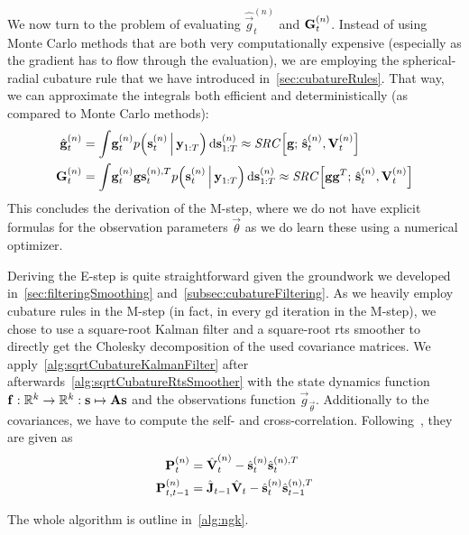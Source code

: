 	We now turn to the problem of evaluating \( \hat{\vec{g}}_t^{(n)} \) and \( \boldsymbol{\mathrm{G}}_t^{(n)} \). Instead of using Monte Carlo methods that are both very computationally expensive (especially as the gradient has to flow through the evaluation), we are employing the spherical-radial cubature rule that we have introduced in~\autoref{sec:cubatureRules}. That way, we can approximate the integrals both efficient and deterministically (as compared to Monte Carlo methods):
	\begin{align}
		\hat{\boldsymbol{\mathrm{g}}}_t^{(n)} &= \int\! \boldsymbol{\mathrm{g}}_t^{(n)} p\Big(\boldsymbol{\mathrm{s}}_t^{(n)} \,\Big\vert\, \boldsymbol{\mathrm{y}}_{1:T}\Big) \dd{\boldsymbol{\mathrm{s}}_{1:T}^{(n)}} \approx \mathit{SRC}\Big[\boldsymbol{\mathrm{g}};\, \hat{\boldsymbol{\mathrm{s}}}_t^{(n)}, \boldsymbol{\mathrm{V}}_t^{(n)}\Big]  \label{eq:ngkgeval} \\
		\boldsymbol{\mathrm{G}}_t^{(n)}       &= \int\! \boldsymbol{\mathrm{g}}_t^{(n)} \boldsymbol{\mathrm{g}}\boldsymbol{\mathrm{s}}_t^{(n), T} p\Big(\boldsymbol{\mathrm{s}}_t^{(n)} \,\Big\vert\, \boldsymbol{\mathrm{y}}_{1:T} \Big) \dd{\boldsymbol{\mathrm{s}}_{1:T}^{(n)}} \approx \mathit{SRC}\Big[\boldsymbol{\mathrm{g}} \boldsymbol{\mathrm{g}}^T;\, \hat{\boldsymbol{\mathrm{s}}}_t^{(n)}, \boldsymbol{\mathrm{V}}_t^{(n)}\Big]  \label{eq:ngkGeval}
	\end{align}
	This concludes the derivation of the M-step, where we do not have explicit formulas for the observation parameters \(\vec{\theta}\) as we do learn these using a numerical optimizer.

	Deriving the E-step is quite straightforward given the groundwork we developed in~\autoref{sec:filteringSmoothing} and~\autoref{subsec:cubatureFiltering}. As we heavily employ cubature rules in the M-step (in fact, in every \ac{gd} iteration in the M-step), we chose to use a square-root Kalman filter and a square-root \ac{rts} smoother to directly get the Cholesky decomposition of the used covariance matrices. We apply~\autoref{alg:sqrtCubatureKalmanFilter} after afterwards~\autoref{alg:sqrtCubatureRtsSmoother} with the state dynamics function \( \boldsymbol{\mathrm{f}} : \mathbb{R}^k \to \mathbb{R}^k : \boldsymbol{\mathrm{s}} \mapsto \boldsymbol{\mathrm{A}} \boldsymbol{\mathrm{s}} \) and the observations function \( \vec{g}_{\vec{\theta}} \). Additionally to the covariances, we have to compute the self- and cross-correlation. Following~\cite{minkaHiddenMarkovModels1999}, they are given as
	\begin{align*}
		\boldsymbol{\mathrm{P}}_t^{(n)} &= \hat{\boldsymbol{\mathrm{V}}}_t^{(n)} - \hat{\boldsymbol{\mathrm{s}}}_t^{(n)} \hat{\boldsymbol{\mathrm{s}}}_t^{(n), T} \\
		\boldsymbol{\mathrm{P}}_{t, t - 1}^{(n)} &= \hat{\boldsymbol{\mathrm{J}}}_{t - 1} \hat{\boldsymbol{\mathrm{V}}}_t - \hat{\boldsymbol{\mathrm{s}}}_{t}^{(n)} \hat{\boldsymbol{\mathrm{s}}}_{t - 1}^{(n), T}
	\end{align*}

	The whole \algname algorithm is outline in~\autoref{alg:ngk}.


